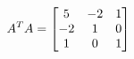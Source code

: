 \documentclass[preview]{standalone}
\begin{document}
\begin{align*}
\special{dvisvgm:raw <g id='unique000'>}A^T A = \begin{bmatrix} 5 & -2 & 1 \\ -2 & 1 & 0 \\ 1 & 0 & 1 \end{bmatrix}\special{dvisvgm:raw </g>}
\end{align*}
\end{document}
